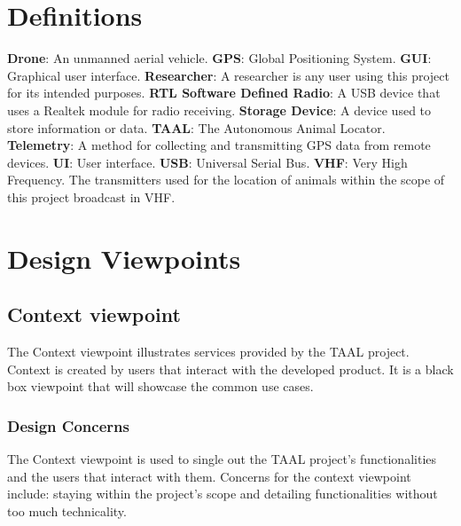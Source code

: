 \documentclass[onecolumn, draftclsnofoot,10pt, compsoc]{IEEEtran}
\begin{document}
\section{Definitions}
\textbf{Drone}: An unmanned aerial vehicle. \newline
\textbf{GPS}: Global Positioning System. \newline
\textbf{GUI}: Graphical user interface. \newline
\textbf{Researcher}: A researcher is any user using this project for its intended purposes. \newline
\textbf{RTL Software Defined Radio}:  A USB device that uses a Realtek module for radio receiving. \newline
\textbf{Storage Device}: A device used to store information or data. \newline
\textbf{TAAL}: The Autonomous Animal Locator. \newline
\textbf{Telemetry}: A method for collecting and transmitting GPS data from remote devices. \newline
\textbf{UI}: User interface. \newline
\textbf{USB}: Universal Serial Bus. \newline
\textbf{VHF}: Very High Frequency. The transmitters used for the location of animals within the scope of this project broadcast in VHF.\newline


\section{Design Viewpoints}

\subsection{Context viewpoint}

The Context viewpoint illustrates services provided by the TAAL project.
Context is created by users that interact with the developed product.
It is a black box viewpoint that will showcase the common use cases.

\subsubsection{Design Concerns}

The Context viewpoint is used to single out the TAAL project's functionalities and the users that interact with them.
Concerns for the context viewpoint include: staying within the project's scope and detailing functionalities without too much technicality.
\end{document}
